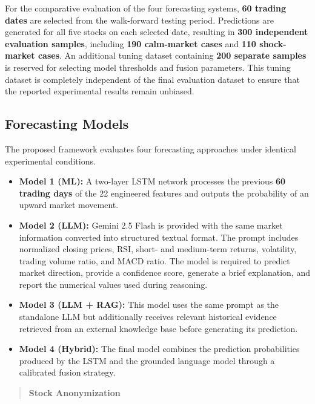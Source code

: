 For the comparative evaluation of the four forecasting systems,
\textbf{60 trading dates} are selected from the walk-forward testing
period. Predictions are generated for all five stocks on each selected
date, resulting in \textbf{300 independent evaluation samples},
including \textbf{190 calm-market cases} and \textbf{110 shock-market
cases}. An additional tuning dataset containing \textbf{200 separate
samples} is reserved for selecting model thresholds and fusion
parameters. This tuning dataset is completely independent of the final
evaluation dataset to ensure that the reported experimental results
remain unbiased.

\subsection{Forecasting Models}\label{sec:forecasting-models}

The proposed framework evaluates four forecasting approaches under
identical experimental conditions.

\begin{itemize}
\item
  \textbf{Model 1 (ML):} A two-layer LSTM network processes the previous
  \textbf{60 trading days} of the 22 engineered features and outputs the
  probability of an upward market movement.
\item
  \textbf{Model 2 (LLM):} Gemini 2.5 Flash is provided with the same
  market information converted into structured textual format. The
  prompt includes normalized closing prices, RSI, short- and medium-term
  returns, volatility, trading volume ratio, and MACD ratio. The model
  is required to predict market direction, provide a confidence score,
  generate a brief explanation, and report the numerical values used
  during reasoning.
\item
  \textbf{Model 3 (LLM + RAG):} This model uses the same prompt as the
  standalone LLM but additionally receives relevant historical evidence
  retrieved from an external knowledge base before generating its
  prediction.
\item
  \textbf{Model 4 (Hybrid):} The final model combines the prediction
  probabilities produced by the LSTM and the grounded language model
  through a calibrated fusion strategy.
\end{itemize}

\begin{quote}
\textbf{Stock Anonymization}
\end{quote}

